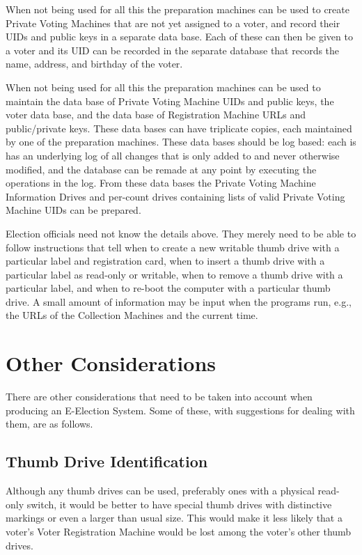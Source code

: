 \documentclass[12pt]{article}
\begin{document}
When not being used for all this the preparation machines can
be used to create Private Voting Machines that are not yet
assigned to a voter, and record their UIDs and public keys
in a separate data base.  Each of these can then be given to a voter
and its UID can be recorded in the separate database that records
the name, address, and birthday of the voter.

When not being used for all this the preparation machines can
be used to maintain the data base of Private Voting Machine
UIDs and public keys,
the voter data base, and the data base of
Registration Machine URLs and public/private keys.
These data bases can have triplicate copies, each maintained
by one of the preparation machines.  These data bases should
be log based: each is has an underlying log of all changes
that is only added to and never otherwise modified,
and the database can be remade at any point by executing the
operations in the log.  From these data bases the Private
Voting Machine Information Drives and per-count drives
containing lists of valid Private Voting Machine UIDs
can be prepared.

Election officials need not know the details above.
They merely need to be able to follow instructions that tell
when to create a new writable thumb drive with a particular
label and registration card,
when to insert a thumb drive with a particular label
as read-only or writable,
when to remove a thumb drive with a particular label, and
when to re-boot the computer with a particular thumb drive.
A small amount of information may be input when the programs run,
e.g., the URLs of the Collection Machines and the current time.


\section{Other Considerations}

There are other considerations that need to be taken into
account when producing an E-Election System.  Some of these,
with suggestions for dealing with them, are as follows.

\subsection{Thumb Drive Identification}

Although any thumb drives can be used, preferably ones with
a physical read-only switch, it would be better to
have special thumb drives with distinctive markings or even
a larger than usual size.  This would make it less likely
that a voter's Voter Registration Machine would be lost
among the voter's other thumb drives.
\end{document}
